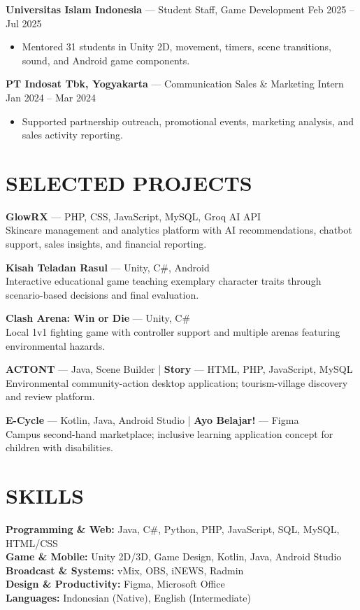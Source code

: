 \documentclass[a4paper,10pt]{article}
\begin{document}
\textbf{Universitas Islam Indonesia} --- Student Staff, Game Development
\hfill Feb 2025 -- Jul 2025
\begin{itemize}
  \item Mentored 31 students in Unity 2D, movement, timers, scene transitions, sound, and Android game components.
\end{itemize}

\textbf{PT Indosat Tbk, Yogyakarta} --- Communication Sales \& Marketing Intern
\hfill Jan 2024 -- Mar 2024
\begin{itemize}
  \item Supported partnership outreach, promotional events, marketing analysis, and sales activity reporting.
\end{itemize}

\section*{SELECTED PROJECTS}
\textbf{GlowRX} --- PHP, CSS, JavaScript, MySQL, Groq AI API\\
Skincare management and analytics platform with AI recommendations, chatbot support, sales insights,
and financial reporting.

\textbf{Kisah Teladan Rasul} --- Unity, C\#, Android\\
Interactive educational game teaching exemplary character traits through scenario-based decisions
and final evaluation.

\textbf{Clash Arena: Win or Die} --- Unity, C\#\\
Local 1v1 fighting game with controller support and multiple arenas featuring environmental hazards.

\textbf{ACTONT} --- Java, Scene Builder \quad | \quad
\textbf{Story} --- HTML, PHP, JavaScript, MySQL\\
Environmental community-action desktop application; tourism-village discovery and review platform.

\textbf{E-Cycle} --- Kotlin, Java, Android Studio \quad | \quad
\textbf{Ayo Belajar!} --- Figma\\
Campus second-hand marketplace; inclusive learning application concept for children with disabilities.

\section*{SKILLS}
\textbf{Programming \& Web:} Java, C\#, Python, PHP, JavaScript, SQL, MySQL, HTML/CSS\\
\textbf{Game \& Mobile:} Unity 2D/3D, Game Design, Kotlin, Java, Android Studio\\
\textbf{Broadcast \& Systems:} vMix, OBS, iNEWS, Radmin\\
\textbf{Design \& Productivity:} Figma, Microsoft Office\\
\textbf{Languages:} Indonesian (Native), English (Intermediate)
\end{document}
